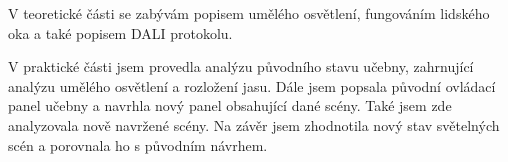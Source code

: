 \medskip
V teoretické části se zabývám popisem umělého osvětlení, fungováním lidského oka a také popisem DALI protokolu.

\medskip
V praktické části jsem provedla analýzu původního stavu učebny, zahrnující analýzu umělého osvětlení a
rozložení jasu. Dále jsem popsala původní ovládací panel učebny a navrhla nový panel obsahující dané scény.
Také jsem zde analyzovala nově navržené scény. Na závěr jsem zhodnotila nový stav světelných scén a porovnala ho s původním návrhem.





